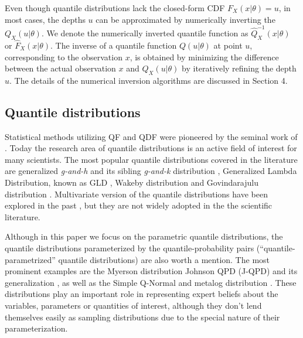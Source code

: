 \documentclass[ba]{imsart}
\numberwithin{equation}{section}
\theoremstyle{plain}
\begin{document}
Even though quantile distributions lack the closed-form CDF \(F_X(x|\theta)=u\), in most cases, the depths \(u\) can be approximated by numerically inverting the \(Q_X(u|\theta)\). We denote the numerically inverted quantile function as \(\widehat{Q}^{-1}_X(x|\theta)\) or \(\widehat{F}_X(x|\theta)\). The inverse of a quantile function \(Q(u|\theta)\) at point \(u\), corresponding to the observation \(x\), is obtained by minimizing the difference between the actual observation \(x\) and \(Q_X(u|\theta)\) by iteratively refining the depth \(u\). The details of the numerical inversion algorithms are discussed in Section 4.

\hypertarget{quantile-distributions}{%
\subsection{Quantile distributions}\label{quantile-distributions}}

Statistical methods utilizing QF and QDF were pioneered by the seminal work of \citet{parzen1979NonparametricStatisticalData}. Today the research area of quantile distributions is an active field of interest for many scientists. The most popular quantile distributions covered in the literature are generalized \emph{g-and-h} and its sibling \emph{g-and-k} distribution \citep{haynes2005BayesianEstimationGandk, jacob2017LikelihoodCalculationGandk, prangle2017GkPackageGandk, rayner2002NumericalMaximumLikelihood}, Generalized Lambda Distribution, known as GLD \citep{aldeni2017FamiliesDistributionsArising, chalabi2012FlexibleDistributionModeling, dedduwakumara2021EfficientEstimatorParameters, fournier2007EstimatingParametersGeneralized, freimer1988StudyGeneralizedTukey}, Wakeby distribution \citep{rahman2015ApplicabilityWakebyDistribution} and Govindarajulu distribution \citep{nair2012GovindarajuluDistributionProperties, nair2013QuantileBasedReliabilityAnalysis}. Multivariate version of the quantile distributions have been explored in the past \citep{field2006MultivariateGandhDistribution, serfling2002QuantileFunctionsMultivariate}, but they are not widely adopted in the the scientific literature.

Although in this paper we focus on the parametric quantile distributions, the quantile distributions parameterized by the quantile-probability pairs (``quantile-parametrized'' quantile distributions) are also worth a mention. The most prominent examples are the Myerson distribution \citep{myerson2005ProbabilityModelsEconomic} Johnson QPD (J-QPD) and its generalization \citep{hadlock2017JohnsonQuantileParameterizedDistributions, hadlock2019GeneralizedJohnsonQuantileParameterized}, as well as the Simple Q-Normal\citep{keelin2011QuantileParameterizedDistributions} and metalog distribution \citep{keelin2016MetalogDistributions}. These distributions play an important role in representing expert beliefs about the variables, parameters or quantities of interest, although they don't lend themselves easily as sampling distributions due to the special nature of their parameterization.
\end{document}
